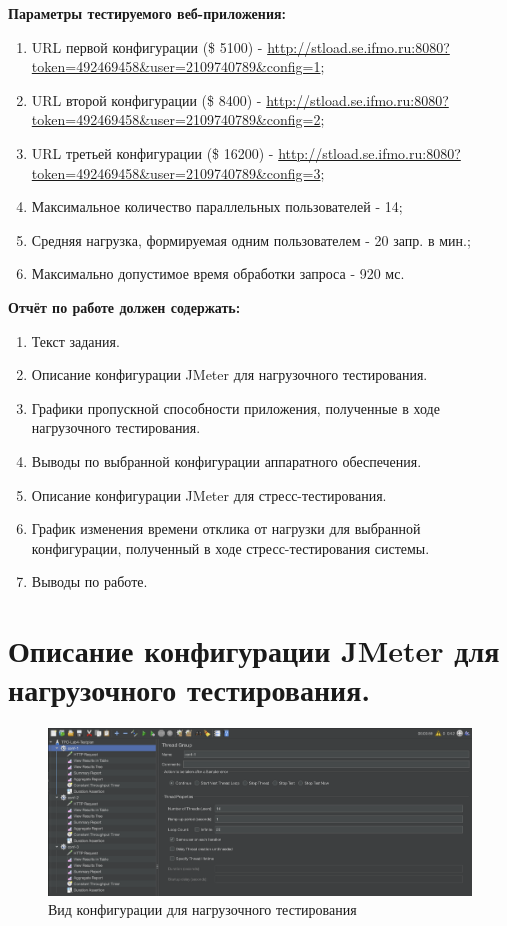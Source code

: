 \documentclass[12pt,onecolumn]{article}
\begin{document}
\textbf{Параметры тестируемого веб-приложения:}
\begin{enumerate}
  \item URL первой конфигурации (\$ 5100) - \url{http://stload.se.ifmo.ru:8080?token=492469458&user=2109740789&config=1};
  \item URL второй конфигурации (\$ 8400) - \url{http://stload.se.ifmo.ru:8080?token=492469458&user=2109740789&config=2};
  \item URL третьей конфигурации (\$ 16200) - \url{http://stload.se.ifmo.ru:8080?token=492469458&user=2109740789&config=3};
  \item Максимальное количество параллельных пользователей - 14;
  \item Средняя нагрузка, формируемая одним пользователем - 20 запр. в мин.;
  \item Максимально допустимое время обработки запроса - 920 мс.
\end{enumerate}
\textbf{Отчёт по работе должен содержать:}
\begin{enumerate}
  \item Текст задания.
  \item Описание конфигурации JMeter для нагрузочного тестирования.
  \item Графики пропускной способности приложения, полученные в ходе нагрузочного тестирования.
  \item Выводы по выбранной конфигурации аппаратного обеспечения.
  \item Описание конфигурации JMeter для стресс-тестирования.
  \item График изменения времени отклика от нагрузки для выбранной конфигурации, полученный в ходе стресс-тестирования системы.
  \item Выводы по работе.
\end{enumerate}

\section*{Описание конфигурации JMeter для нагрузочного тестирования.}

\begin{figure}[H]
  \includegraphics[width=\textwidth]{image/thread-group.png}
  \caption{Вид конфигурации для нагрузочного тестирования}
\end{figure}
\end{document}
